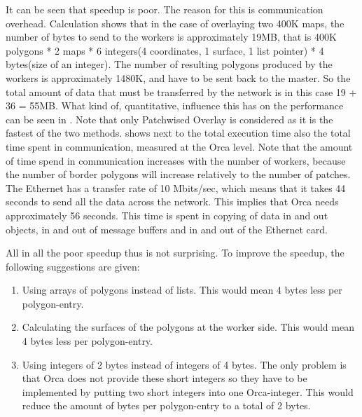 \begin{figure}[hbt]
  \begin{center}
    \leavevmode
    \epsfysize=8cm
  \end{center}
\end{figure}

\begin{figure}[hbt]
  \begin{center}
    \leavevmode
    \epsfysize=8cm
  \end{center}
\end{figure}

It can be seen that speedup is poor.
The reason for this is communication overhead.
Calculation shows that in the case of overlaying two 400K maps,
the number of bytes to send to the workers is approximately
19MB, that is 400K polygons * 2 maps * 6 integers(4 coordinates, 1 surface,
1 list pointer) * 4 bytes(size of an integer).
The number of resulting polygons produced by the workers is approximately
1480K, and have to be sent back to the master.
So the total amount of data that must be transferred by the network is
in this case 19 + 36 = 55MB.
What kind of, quantitative, influence this has on the performance can be
seen in
.
Note that only Patchwised Overlay is considered as it is the
fastest of the two methods.
  shows next to the total
execution time also the total time spent in communication, measured at
the Orca level.
Note that the amount of time spend in communication increases with the
number of workers, because the number of border polygons will increase
relatively to the number of patches.
The Ethernet has a transfer rate of 10 Mbits/sec,
which means that it takes 44 seconds to send all the data across the
network.
This implies that Orca needs approximately 56 seconds.
This time is spent in copying of data in and out objects, in and out of
message buffers and in and out of the Ethernet card.

All in all the poor speedup thus is not surprising.
To improve the speedup, the following suggestions are given:
\begin{enumerate}
  \item Using arrays of polygons instead of lists.
    This would mean 4 bytes less per polygon-entry.
  \item Calculating the surfaces of the polygons at the worker side.
    This would mean 4 bytes less per polygon-entry.
  \item Using integers of 2 bytes instead of integers of 4 bytes.
    The only problem is that Orca does not provide these short integers so
    they have to be implemented by putting two short integers into one
    Orca-integer.
    This would reduce the amount of bytes per polygon-entry to a
    total of 2 bytes.
\end{enumerate}

